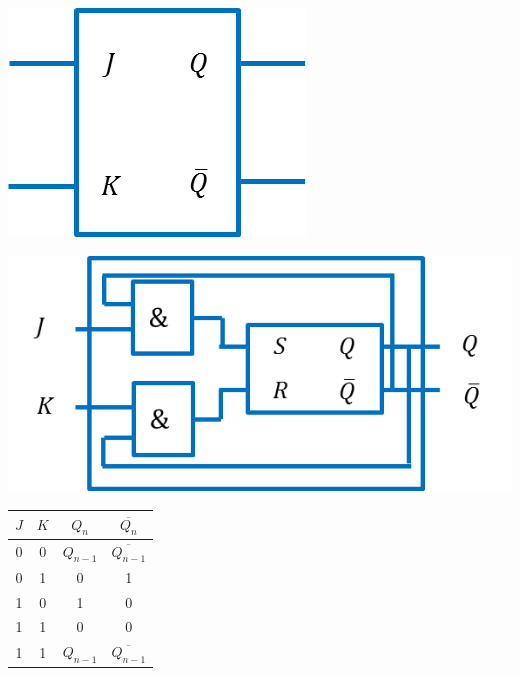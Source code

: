 \documentclass[10pt,fleqn]{article} %
\begin{document}
  \vspace{.2cm}
\hfill
\begin{minipage}[c]{.15\linewidth}
\begin{center}
\includegraphics[width=\textwidth]{images/basculeJK}
\end{center}
\end{minipage} \hfill
\begin{minipage}[c]{.4\linewidth}
\begin{center}
\includegraphics[width=\textwidth]{images/basculeJK_logi}
\end{center}

\end{minipage} \hfill
\begin{minipage}[c]{.35\linewidth}

\begin{center}
\begin{tabular}{|c|c||c|c|}
\hline
$J$ & $K$ &  $Q_n$ & $\overline{Q_{n}}$ \\
\hline \hline
0 & 0 & $Q_{n-1}$ & $\overline{Q_{n-1}}$ \\ \hline
0 & 1 & 0 & 1 \\\hline
1 & 0 & 1 & 0 \\\hline
1 & 1 & 0 & 0 \\\hline
1 & 1 & $Q_{n-1}$ & $\overline{Q_{n-1}}$ \\\hline
\end{tabular}
\end{center}
\end{minipage}\hfill
\end{document}

